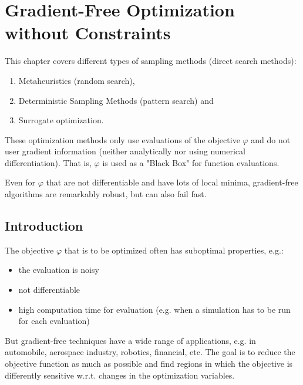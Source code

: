 \chapter{Gradient-Free Optimization without Constraints}
	This chapter covers different types of sampling methods (direct search methods):
	\begin{enumerate}
		\item Metaheuristics (random search),
		\item Deterministic Sampling Methods (pattern search) and
		\item Surrogate optimization.
	\end{enumerate}
	These optimization methods only use evaluations of the objective \(\varphi\) and do not user gradient information (neither analytically nor using numerical differentiation). That is, \(\varphi\) is used as a "Black Box" for function evaluations.

	Even for \(\varphi\) that are not differentiable and have lots of local minima, gradient-free algorithms are remarkably robust, but can also fail fast.

	\section{Introduction}
		The objective \(\varphi\) that is to be optimized often has suboptimal properties, e.g.:
		\begin{itemize}
			\item the evaluation is noisy
			\item not differentiable
			\item high computation time for evaluation (e.g. when a simulation has to be run for each evaluation)
		\end{itemize}
	
		But gradient-free techniques have a wide range of applications, e.g. in automobile, aerospace industry, robotics, financial, etc. The goal is to reduce the objective function as much as possible and find regions in which the objective is differently sensitive w.r.t. changes in the optimization variables.

